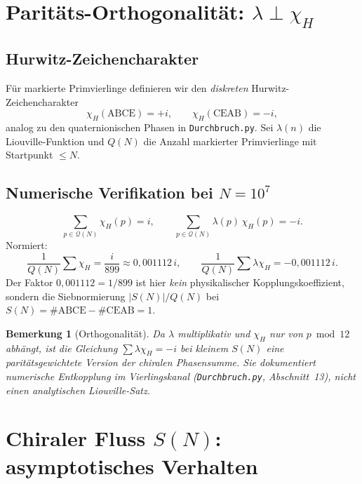 \documentclass[12pt,a4paper]{article}
\newtheorem{bemerkung}[satz]{Bemerkung}
\begin{document}
\section{Paritäts-Orthogonalität: $\lambda\perp\chi_H$}
\label{sec:liouville}

\subsection{Hurwitz-Zeichencharakter}

Für markierte Primvierlinge definieren wir den \emph{diskreten}
Hurwitz-Zeichencharakter
\[
\chi_H(\mathrm{ABCE})=+i,\qquad \chi_H(\mathrm{CEAB})=-i,
\]
analog zu den quaternionischen Phasen in \texttt{Durchbruch.py}.
Sei $\lambda(n)$ die Liouville-Funktion und $Q(N)$ die Anzahl
markierter Primvierlinge mit Startpunkt $\le N$.

\subsection{Numerische Verifikation bei $N=10^7$}

\begin{tcolorbox}[numerisch,title={Reproduziert ($N=10^7$, $Q=899$)}]
\[
\sum_{p\in\mathcal{Q}(N)} \chi_H(p) = i,\qquad
\sum_{p\in\mathcal{Q}(N)} \lambda(p)\,\chi_H(p) = -i.
\]
Normiert:
\[
\frac{1}{Q(N)}\sum \chi_H = \frac{i}{899}\approx 0{,}001112\,i,\qquad
\frac{1}{Q(N)}\sum \lambda\chi_H = -0{,}001112\,i.
\]
Der Faktor $0{,}001112 = 1/899$ ist hier \emph{kein} physikalischer
Kopplungskoeffizient, sondern die Siebnormierung $|S(N)|/Q(N)$ bei
$S(N)=\#\mathrm{ABCE}-\#\mathrm{CEAB}=1$.
\end{tcolorbox}

\begin{bemerkung}[Orthogonalität]
Da $\lambda$ multiplikativ und $\chi_H$ nur von $p\bmod 12$ abhängt,
ist die Gleichung $\sum\lambda\chi_H=-i$ bei kleinem $S(N)$ eine
\emph{paritätsgewichtete} Version der chiralen Phasensumme.
Sie dokumentiert numerische Entkopplung im Vierlingskanal
(\texttt{Durchbruch.py}, Abschnitt~13), nicht einen analytischen
Liouville-Satz.
\end{bemerkung}

\section{Chiraler Fluss $S(N)$: asymptotisches Verhalten}
\label{sec:fluss}
\end{document}
